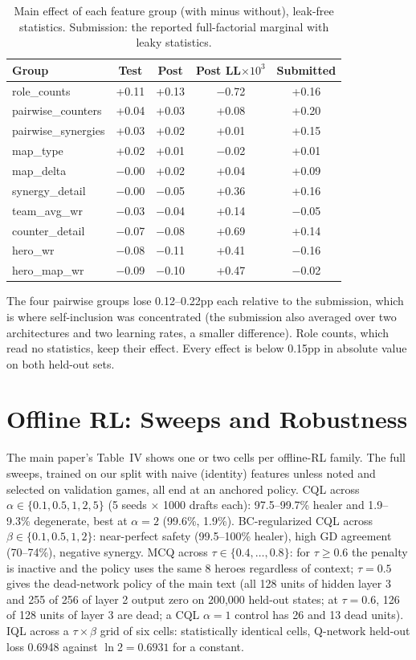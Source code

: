 \documentclass[journal]{IEEEtran}
\begin{document}
\begin{table}[t]
\centering
\caption{Main effect of each feature group (with minus without), leak-free statistics. Submission: the reported full-factorial marginal with leaky statistics.}
\label{tab:sweep}
\setlength{\tabcolsep}{2.5pt}
\small
\begin{tabular}{lcccc}
\toprule
Group & Test & Post & Post LL$\times10^{3}$ & Submitted \\
\midrule
role\_counts & +0.11 & +0.13 & $-$0.72 & +0.16 \\
pairwise\_counters & +0.04 & +0.03 & +0.08 & +0.20 \\
pairwise\_synergies & +0.03 & +0.02 & +0.01 & +0.15 \\
map\_type & +0.02 & +0.01 & $-$0.02 & +0.01 \\
map\_delta & $-$0.00 & +0.02 & +0.04 & +0.09 \\
synergy\_detail & $-$0.00 & $-$0.05 & +0.36 & +0.16 \\
team\_avg\_wr & $-$0.03 & $-$0.04 & +0.14 & $-$0.05 \\
counter\_detail & $-$0.07 & $-$0.08 & +0.69 & +0.14 \\
hero\_wr & $-$0.08 & $-$0.11 & +0.41 & $-$0.16 \\
hero\_map\_wr & $-$0.09 & $-$0.10 & +0.47 & $-$0.02 \\
\bottomrule
\end{tabular}
\end{table}

The four pairwise groups lose 0.12--0.22pp each relative to the submission, which is where self-inclusion was concentrated (the submission also averaged over two architectures and two learning rates, a smaller difference). Role counts, which read no statistics, keep their effect. Every effect is below 0.15pp in absolute value on both held-out sets.

\section{Offline RL: Sweeps and Robustness}
\label{sec:cqlrobust}

The main paper's Table~IV shows one or two cells per offline-RL family. The full sweeps, trained on our split with naive (identity) features unless noted and selected on validation games, all end at an anchored policy. CQL across $\alpha \in \{0.1, 0.5, 1, 2, 5\}$ (5 seeds $\times$ 1000 drafts each): 97.5--99.7\% healer and 1.9--9.3\% degenerate, best at $\alpha = 2$ (99.6\%, 1.9\%). BC-regularized CQL across $\beta \in \{0.1, 0.5, 1, 2\}$: near-perfect safety (99.5--100\% healer), high GD agreement (70--74\%), negative synergy. MCQ across $\tau \in \{0.4, \dots, 0.8\}$: for $\tau \geq 0.6$ the penalty is inactive and the policy uses the same 8 heroes regardless of context; $\tau = 0.5$ gives the dead-network policy of the main text (all 128 units of hidden layer 3 and 255 of 256 of layer 2 output zero on 200,000 held-out states; at $\tau = 0.6$, 126 of 128 units of layer 3 are dead; a CQL $\alpha = 1$ control has 26 and 13 dead units). IQL across a $\tau \times \beta$ grid of six cells: statistically identical cells, Q-network held-out loss 0.6948 against $\ln 2 = 0.6931$ for a constant.
\end{document}
